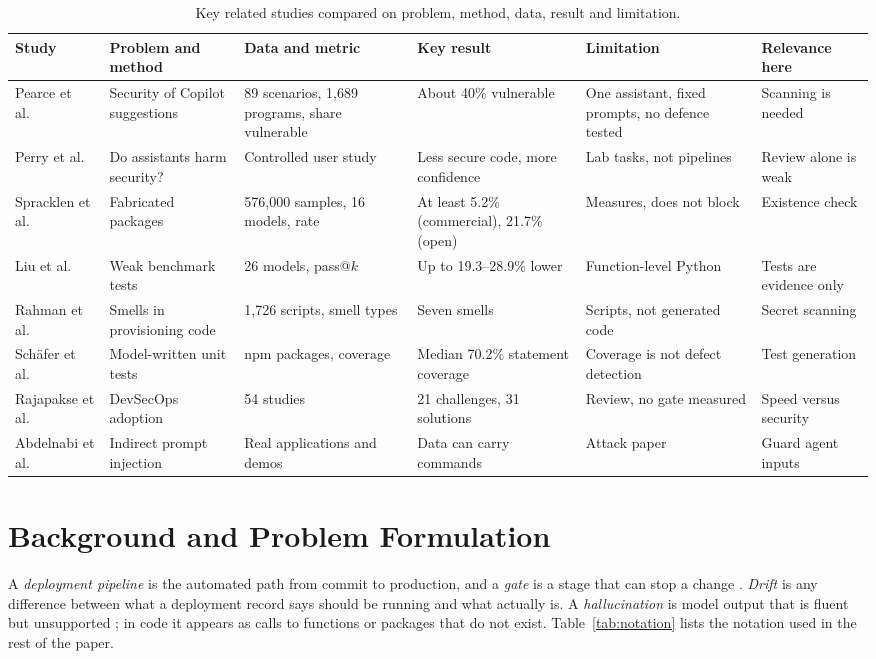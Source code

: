 \documentclass[12pt,onecolumn,draftclsnofoot]{IEEEtran}
\begin{document}
\begin{table}[htbp]\centering
\caption{Key related studies compared on problem, method, data, result and limitation.}
\label{tab:work}\scriptsize\setlength{\tabcolsep}{3pt}
\begin{tabular}{@{}p{.10\linewidth}p{.16\linewidth}p{.16\linewidth}p{.17\linewidth}p{.16\linewidth}p{.12\linewidth}@{}}
\toprule Study & Problem and method & Data and metric & Key result & Limitation & Relevance here\\\midrule
Pearce et al.\ \cite{pearce2022} & Security of Copilot suggestions & 89 scenarios, 1,689 programs, share vulnerable & About 40\% vulnerable & One assistant, fixed prompts, no defence tested & Scanning is needed\\
Perry et al.\ \cite{perry2023} & Do assistants harm security? & Controlled user study & Less secure code, more confidence & Lab tasks, not pipelines & Review alone is weak\\
Spracklen et al.\ \cite{spracklen2025} & Fabricated packages & 576,000 samples, 16 models, rate & At least 5.2\% (commercial), 21.7\% (open) & Measures, does not block & Existence check\\
Liu et al.\ \cite{liu2023evalplus} & Weak benchmark tests & 26 models, pass@$k$ & Up to 19.3--28.9\% lower & Function-level Python & Tests are evidence only\\
Rahman et al.\ \cite{rahman2019sins} & Smells in provisioning code & 1,726 scripts, smell types & Seven smells & Scripts, not generated code & Secret scanning\\
Sch{\"a}fer et al.\ \cite{schafer2024} & Model-written unit tests & npm packages, coverage & Median 70.2\% statement coverage & Coverage is not defect detection & Test generation\\
Rajapakse et al.\ \cite{rajapakse2022} & DevSecOps adoption & 54 studies & 21 challenges, 31 solutions & Review, no gate measured & Speed versus security\\
Abdelnabi et al.\ \cite{abdelnabi2023} & Indirect prompt injection & Real applications and demos & Data can carry commands & Attack paper & Guard agent inputs\\
\bottomrule\end{tabular}
\end{table}

\section{Background and Problem Formulation}
A \emph{deployment pipeline} is the automated path from commit to production, and a \emph{gate} is a stage that can stop a change \cite{humble2010}. \emph{Drift} is any difference between what a deployment record says should be running and what actually is. A \emph{hallucination} is model output that is fluent but unsupported \cite{ji2023}; in code it appears as calls to functions or packages that do not exist. Table~\ref{tab:notation} lists the notation used in the rest of the paper.
\end{document}
